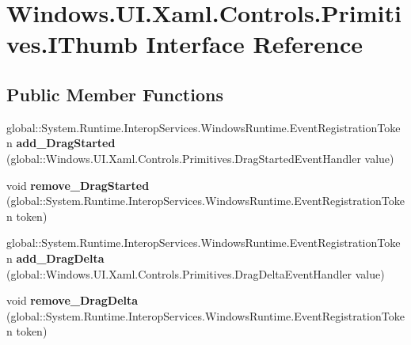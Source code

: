\hypertarget{interface_windows_1_1_u_i_1_1_xaml_1_1_controls_1_1_primitives_1_1_i_thumb}{}\section{Windows.\+U\+I.\+Xaml.\+Controls.\+Primitives.\+I\+Thumb Interface Reference}
\label{interface_windows_1_1_u_i_1_1_xaml_1_1_controls_1_1_primitives_1_1_i_thumb}
\subsection*{Public Member Functions}
\begin{DoxyCompactItemize}
\item 
\mbox{\label{interface_windows_1_1_u_i_1_1_xaml_1_1_controls_1_1_primitives_1_1_i_thumb_af16d7fcdb997b8237d826597ee4dfdf9}} 
global\+::\+System.\+Runtime.\+Interop\+Services.\+Windows\+Runtime.\+Event\+Registration\+Token {\bfseries add\+\_\+\+Drag\+Started} (global\+::\+Windows.\+U\+I.\+Xaml.\+Controls.\+Primitives.\+Drag\+Started\+Event\+Handler value)
\item 
\mbox{\label{interface_windows_1_1_u_i_1_1_xaml_1_1_controls_1_1_primitives_1_1_i_thumb_a160f1c382efe8c910b223fd4ae316948}} 
void {\bfseries remove\+\_\+\+Drag\+Started} (global\+::\+System.\+Runtime.\+Interop\+Services.\+Windows\+Runtime.\+Event\+Registration\+Token token)
\item 
\mbox{\label{interface_windows_1_1_u_i_1_1_xaml_1_1_controls_1_1_primitives_1_1_i_thumb_adb368ed2352b40482e7d4b409ff13165}} 
global\+::\+System.\+Runtime.\+Interop\+Services.\+Windows\+Runtime.\+Event\+Registration\+Token {\bfseries add\+\_\+\+Drag\+Delta} (global\+::\+Windows.\+U\+I.\+Xaml.\+Controls.\+Primitives.\+Drag\+Delta\+Event\+Handler value)
\item 
\mbox{\label{interface_windows_1_1_u_i_1_1_xaml_1_1_controls_1_1_primitives_1_1_i_thumb_a7f2e0d4f77e1da383618536040a32d00}} 
void {\bfseries remove\+\_\+\+Drag\+Delta} (global\+::\+System.\+Runtime.\+Interop\+Services.\+Windows\+Runtime.\+Event\+Registration\+Token token)

\end{DoxyCompactItemize}
